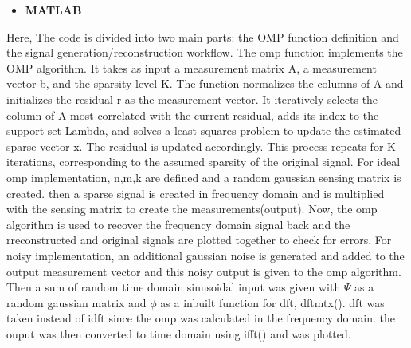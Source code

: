 \documentclass[
  letterpaper,
  DIV=11,
  numbers=noendperiod]{scrartcl}
\providecommand{\tightlist}{%
  \setlength{\itemsep}{0pt}\setlength{\parskip}{0pt}}
\begin{document}
\begin{itemize}
\tightlist
\item
  \textbf{MATLAB}
\end{itemize}

Here, The code is divided into two main parts: the OMP function
definition and the signal generation/reconstruction workflow. The omp
function implements the OMP algorithm. It takes as input a measurement
matrix A, a measurement vector b, and the sparsity level K. The function
normalizes the columns of A and initializes the residual r as the
measurement vector. It iteratively selects the column of A most
correlated with the current residual, adds its index to the support set
Lambda, and solves a least-squares problem to update the estimated
sparse vector x. The residual is updated accordingly. This process
repeats for K iterations, corresponding to the assumed sparsity of the
original signal. For ideal omp implementation, n,m,k are defined and a
random gaussian sensing matrix is created. then a sparse signal is
created in frequency domain and is multiplied with the sensing matrix to
create the measurements(output). Now, the omp algorithm is used to
recover the frequency domain signal back and the rreconstructed and
original signals are plotted together to check for errors. For noisy
implementation, an additional gaussian noise is generated and added to
the output measurement vector and this noisy output is given to the omp
algorithm. Then a sum of random time domain sinusoidal input was given
with \(\Psi\) as a random gaussian matrix and \(\phi\) as a inbuilt
function for dft, dftmtx(). dft was taken instead of idft since the omp
was calculated in the frequency domain. the ouput was then converted to
time domain using ifft() and was plotted.
\end{document}
